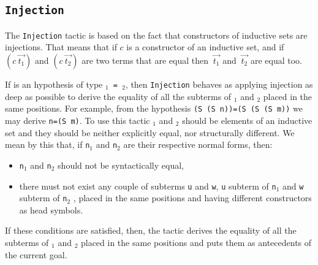 
\subsection{\tt Injection {\ident}}
\label{Injection}
The {\tt Injection} tactic is based on the fact that constructors of
inductive sets are injections. That means that if $c$ is a constructor
of an inductive set, and if $(c~\vec{t_1})$ and $(c~\vec{t_2})$ are two
terms that are equal then $~\vec{t_1}$ and $~\vec{t_2}$ are equal
too.

If {\ident} is an hypothesis of type {\tt {\term$_1$} = {\term$_2$}},
then {\tt Injection} behaves as applying injection as deep as possible to
derive the equality of all the subterms of {\term$_1$} and {\term$_2$}
placed in the same positions. For example, from the hypothesis {\tt (S
  (S n))=(S (S (S m))} we may derive {\tt n=(S m)}.  To use this
tactic {\term$_1$} and {\term$_2$} should be elements of an inductive
set and they should be neither explicitly equal, nor structurally
different. We mean by this that, if {\tt n$_1$} and {\tt n$_2$} are
their respective normal forms, then:
\begin{itemize}
\item {\tt n$_1$} and {\tt n$_2$} should not be syntactically equal,
\item there must not exist any couple of subterms {\tt u} and {\tt w},
  {\tt u} subterm of {\tt n$_1$} and {\tt w} subterm of {\tt n$_2$} ,
  placed in the same positions and having different constructors as
  head symbols.
\end{itemize}
If these conditions are satisfied, then, the tactic derives the
equality of all the subterms of {\term$_1$} and {\term$_2$} placed in
the same positions and puts them as antecedents of the current goal.

